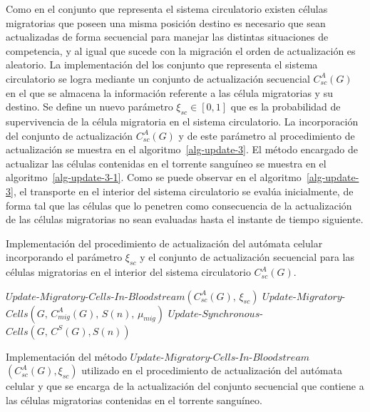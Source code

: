Como en el conjunto que representa el sistema circulatorio existen c\'elulas migratorias que poseen una misma posici\'on destino es necesario que sean actualizadas de forma secuencial para manejar las distintas situaciones de competencia, y al igual que sucede con la migraci\'on el orden de actualizaci\'on es aleatorio. La implementaci\'on del los conjunto que representa el sistema circulatorio se logra mediante un conjunto de actualizaci\'on secuencial $C_{sc}^A(G)$ en el que se almacena la informaci\'on referente a las c\'elula migratorias y su destino. Se define un nuevo par\'ametro $\xi_{sc} \in [0,1]$ que es la probabilidad de supervivencia de la c\'elula migratoria en el sistema circulatorio. La incorporaci\'on del conjunto de actualizaci\'on $C_{sc}^A(G)$ y de este par\'ametro al procedimiento de actualizaci\'on se muestra en el algoritmo~\ref{alg-update-3}. El m\'etodo encargado de actualizar las c\'elulas contenidas en el torrente sangu\'ineo se muestra en el algoritmo~\ref{alg-update-3-1}. Como se puede observar en el algoritmo~\ref{alg-update-3}, el transporte en el interior del sistema circulatorio se eval\'ua inicialmente, de forma tal que las c\'elulas que lo penetren como consecuencia de la actualizaci\'on de las c\'elulas migratorias no sean evaluadas hasta el instante de tiempo siguiente.

\begin{algorithm}[!ht]
\caption{Implementaci\'on del procedimiento de actualizaci\'on del aut\'omata celular incorporando el par\'ametro $\xi_{sc}$ y el conjunto de actualizaci\'on secuencial para las c\'elulas migratorias en el interior del sistema circulatorio $C_{sc}^A(G)$.} \label{alg-update-3}
$Update$-$Migratory$-$Cells$-$In$-$Bloodstream(C_{sc}^A(G),\,\xi_{sc})$\;
$Update$-$Migratory$-$Cells(G,\,C_{mig}^A(G),\,S(n),\,\mu_{mig})$\;
$Update$-$Synchronous$-$Cells(G,\,C^S(G),S(n))$\;
\end{algorithm}

\begin{algorithm}[!ht]
\caption{Implementaci\'on del m\'etodo $Update$-$Migratory$-$Cells$-$In$-$Bloodstream$ $(C_{sc}^A(G),\xi_{sc})$ utilizado en el procedimiento de actualizaci\'on del aut\'omata celular y que se encarga de la actualizaci\'on del conjunto secuencial que contiene a las c\'elulas migratorias contenidas en el torrente sangu\'ineo.} \label{alg-update-3-1}
\end{algorithm}

